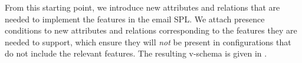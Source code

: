 

From this starting point, we introduce new attributes and relations that are
needed to implement the features in the email SPL. We attach presence
conditions to new attributes and relations corresponding to the features
they are needed to support, which ensure they will \emph{not} be present
in configurations that do not include the relevant features.
%
The resulting v-schema is given in .


